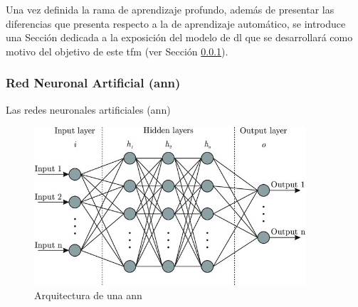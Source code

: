 \vspace{3mm}

Una vez definida la rama de aprendizaje profundo, además de presentar las diferencias que presenta respecto a la de aprendizaje automático, se introduce una Sección dedicada a la exposición del modelo de \gls{dl} que se desarrollará como motivo del objetivo de este \gls{tfm} (ver Sección \ref{sec:dlann}). 

\subsubsection{Red Neuronal Artificial (\acrshort{ann})}
\label{sec:dlann}

Las redes neuronales artificiales (\gls{ann})










\vspace{3mm}

\begin{figure}[h!]
    \centering
    \includegraphics[width=0.9\textwidth]{img/teoria/ann.jpg}
    \caption{Arquitectura de una \acrshort{ann} \cite{ann}}
    \label{fig:features}
\end{figure}

\vspace{3mm}







